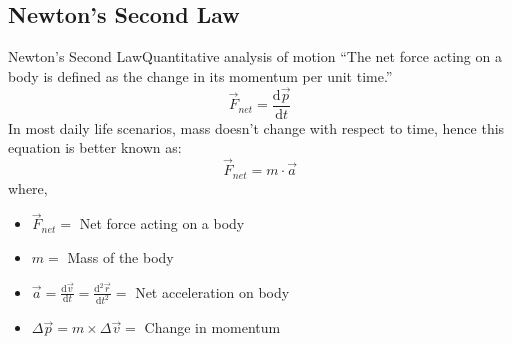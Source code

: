 





\subsection{Newton's Second Law}
\begin{frame}{Newton's Second Law}{Quantitative analysis of motion}
	``The net force acting on a body is defined as the change in its 
	momentum per unit time.''
	\begin{equation}
	\vec{F}_{net} = \frac{\mathrm{d}\vec{p}}{\mathrm{d}t}
	\end{equation}
	In most daily life scenarios, mass doesn't change with respect to
	time, hence this equation is better known as:
	\[\vec{F}_{net} = m\cdot\vec{a}\]
	where,
	\begin{itemize}
	\item \(\vec{F}_{net} = \) Net force acting on a body
	\item \(m = \) Mass of the body
	\item \(\vec{a} = \frac{\mathrm{d}\vec{v}}{\mathrm{d}t} 
		= \frac{\mathrm{d}^2\vec{r}}{\mathrm{d}t^2} = \) 
		Net acceleration on body	
	\item \(\Delta\vec{p} = m\times\Delta\vec{v} = \)
		Change in momentum
	\end{itemize}
\end{frame}